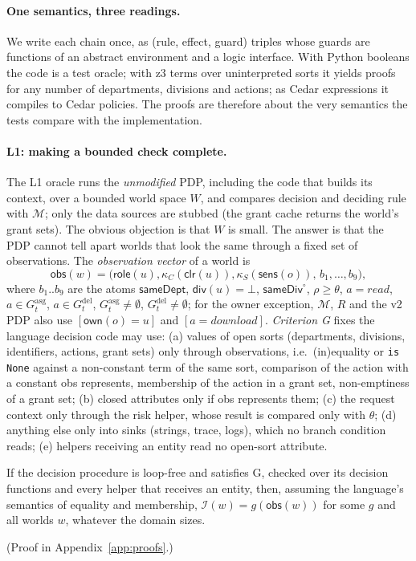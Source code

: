 \documentclass[sigconf,review,anonymous]{acmart}
\newcommand{\Gasg}{G^{\mathrm{asg}}}
\newcommand{\Gdel}{G^{\mathrm{del}}}
\newcommand{\sameDept}{\mathsf{sameDept}}
\newcommand{\sameDiv}{\mathsf{sameDiv}}
\newcommand{\role}{\mathsf{role}}
\newcommand{\obs}{\mathsf{obs}}
\begin{document}
\paragraph{One semantics, three readings.} We write each chain once, as (rule, effect, guard) triples whose guards
are functions of an abstract environment and a logic interface. With Python booleans the code is a test oracle;
with z3 \cite{demoura2008z3} terms over uninterpreted sorts it yields proofs for any number of departments,
divisions and actions; as Cedar expressions it compiles to Cedar policies. The proofs are therefore about the very
semantics the tests compare with the implementation.

\paragraph{L1: making a bounded check complete.} The L1 oracle runs the \emph{unmodified} PDP, including the code
that builds its context, over a bounded world space $W$, and compares decision and deciding rule with $\mathcal{M}$;
only the data sources are stubbed (the grant cache returns the world's grant sets). The obvious objection is that
$W$ is small. The answer is that the PDP cannot tell apart worlds that look the same through a fixed set of
observations. The \emph{observation vector} of a world is
\[
\obs(w)=\bigl(\role(u),\kappa_C(\mathsf{clr}(u)),\kappa_S(\mathsf{sens}(o)),\,b_1,\dots,b_9\bigr),
\]
where $b_1..b_9$ are the atoms $\sameDept$, $\mathsf{div}(u)=\bot$, $\sameDiv^\circ$, $\rho\ge\theta$,
$a=\mathit{read}$, $a\in\Gasg_t$, $a\in\Gdel_t$, $\Gasg_t\neq\emptyset$, $\Gdel_t\neq\emptyset$; for the owner
exception, $\mathcal{M}$, $R$ and the v2 PDP also use $[\mathsf{own}(o)=u]$ and $[a=\mathit{download}]$.
\emph{Criterion G} fixes the language decision code may use: (a) values of open sorts (departments, divisions,
identifiers, actions, grant sets) only through observations, i.e.\ (in)equality or \texttt{is None} against a
non-constant term of the same sort, comparison of the action with a constant obs represents, membership of the
action in a grant set, non-emptiness of a grant set; (b) closed attributes only if obs represents them; (c) the
request context only through the risk helper, whose result is compared only with $\theta$; (d) anything else only
into sinks (strings, trace, logs), which no branch condition reads; (e) helpers receiving an entity read no
open-sort attribute.

\begin{lemma}\label{lem:di}
If the decision procedure is loop-free and satisfies G, checked over its decision functions and every helper that
receives an entity, then, assuming the language's semantics of equality and membership, $\mathcal{I}(w)=g(\obs(w))$
for some $g$ and all worlds $w$, whatever the domain sizes.
\end{lemma}
(Proof in Appendix~\ref{app:proofs}.)
\end{document}
